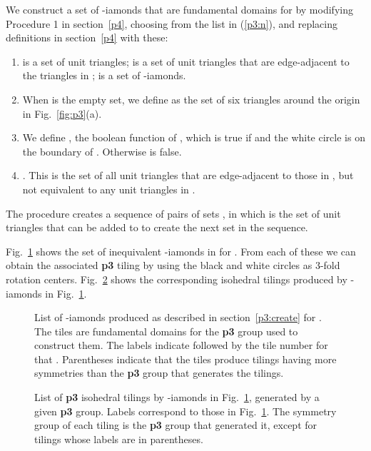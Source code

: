 \documentclass{ws-ijcga}
\begin{document}
We construct a set  of -iamonds
that are fundamental domains for  by modifying
Procedure 1 in section~\ref{p4}, 
choosing  from the list in (\ref{p3:n}), and replacing definitions in section~\ref{p4} with these:

\begin{enumerate}
\item 
 is a set of unit triangles;  is a set of unit triangles that are edge-adjacent to the
triangles in ;  is a set of -iamonds.
\item
When  is the empty set, we define  as the set of six triangles around the origin in
Fig.~\ref{fig:p3}(a).
\item
We define , the boolean function of , which is true if  and the white circle is on
the boundary of  . Otherwise  is false.
\item
. 
This is the set of all unit triangles that are edge-adjacent to those in , 
but not equivalent to any unit triangles in .
\end{enumerate}
The procedure creates a sequence of pairs of sets , 
in which  is the set of unit triangles that can be added to  to
create the next set  in the sequence.

Fig.~\ref{p3fighi} shows the set of inequivalent -iamonds in 
for . From each of these we can
obtain the associated {\bf p3} tiling by using the black and white circles as 3-fold rotation centers.
Fig.~\ref{p3tiling} shows the corresponding isohedral tilings produced by -iamonds in Fig.~\ref{p3fighi}.
\begin{figure}[h]
\centerline{
}
\vspace*{8pt}
\caption{
List of -iamonds produced as described in section~\ref{p3:create} for . 
The tiles are fundamental domains for the
{\bf p3} group used to construct them. 
The labels indicate  followed by the tile number for that . 
Parentheses indicate that the tiles produce tilings having more symmetries 
than the {\bf p3} group that generates the tilings.
\label{p3fighi}
}
\end{figure}
\begin{figure}[h]
\centerline{
}
\vspace*{8pt}
\caption{
List of {\bf p3} isohedral tilings by -iamonds in Fig.~\ref{p3fighi}, 
generated by a given {\bf p3} group. 
Labels correspond to those in Fig.~\ref{p3fighi}. 
The symmetry group of each tiling is the {\bf p3} group that generated it, 
except for tilings whose labels are in parentheses.
\label{p3tiling}
}
\end{figure}
\end{document}
